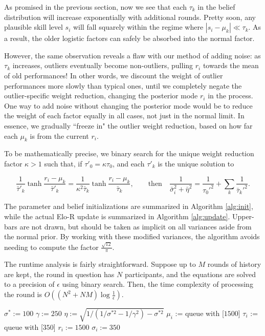 \documentclass{article}
\begin{document}
As promised in the previous section, now we see that each $\tau_k$ in the belief distribution will increase exponentially with additional rounds. Pretty soon, any plausible skill level $s_i$ will fall squarely within the regime where $|s_i-\mu_k| \ll \tau_k$. As a result, the older logistic factors can safely be absorbed into the normal factor.

However, the same observation reveals a flaw with our method of adding noise: as $\tau_k$ increases, outliers eventually become non-outliers, pulling $r_i$ towards the mean of old performances! In other words, we discount the weight of outlier performances more slowly than typical ones, until we completely negate the outlier-specific weight reduction, changing the posterior mode $r_i$ in the process. One way to add noise without changing the posterior mode would be to reduce the weight of each factor equally in all cases, not just in the normal limit. In essence, we gradually ``freeze in" the outlier weight reduction, based on how far each $\mu_k$ is from the current $r_i$.

To be mathematically precise, we binary search for the unique weight reduction factor $\kappa>1$ such that, if $\tau'_0=\kappa\tau_0$, and each $\tau'_k$ is the unique solution to

\[
\frac{1}{\bar\tau'_k} \tanh \frac {r_i-\mu_k} {\bar\tau'_k}
= \frac{1}{\kappa^2\bar\tau_k} \tanh \frac {r_i-\mu_k} {\bar\tau_k},\qquad
\text{then} \quad \frac{1}{\bar\sigma_i^2 + \bar\eta^2}
= \frac{1}{\tau_0'^2} + \sum_k \frac{1}{\bar\tau_k'^2}.
\]

The parameter and belief initializations are summarized in Algorithm \ref{alg:init}, while the actual Elo-R update is summarized in Algorithm \ref{alg:update}. Upper-bars are not drawn, but should be taken as implicit on all variances aside from the normal prior. By working with these modified variances, the algorithm avoids needing to compute the factor $\frac{\sqrt{12}}{\pi}$.

The runtime analysis is fairly straightforward. Suppose up to $M$ rounds of history are kept, the round in question has $N$ participants, and the equations are solved to a precision of $\epsilon$ using binary search. Then, the time complexity of processing the round is $O((N^2 + NM)\log\frac 1\epsilon)$.

\begin{algorithm}
\caption{$init()$}
\label{alg:init}
\begin{algorithmic}
\STATE $\sigma^* := 100$
\STATE $\gamma := 250$
\STATE $\eta := \sqrt{1 / \left( 1/\sigma^{*2} - 1/\gamma^2 \right) - \sigma^{*2}}$
\STATE $\mu_i$ := queue with [$1500$]
\STATE $\tau_i$ := queue with [$350$]
\STATE $r_i := 1500$
\STATE $\sigma_i := 350$
\ENDFOR
\end{algorithmic}
\end{algorithm}
\end{document}
